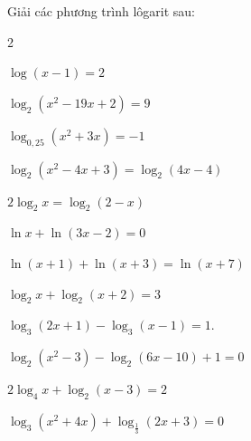 \begin{vd}
	Giải các phương trình lôgarit sau:
	\begin{enumEX}[a)]{2}
		\item $\log {\left( x-1 \right) }=2$
		\item $\log_2\left(x^2-19x+2\right)=9$
		\item $\log_{0{,25}}(x^2+3x)=-1 $
		\item $\log_2 {\left(x^2-4x+3 \right)}=\log_2 {\left(4x-4 \right)}$
		\item $2\log_2x=\log_2(2-x)$ 
		\item $ \ln x+ \ln (3x-2)=0$
		\item $\ln(x+1)+\ln(x+3)=\ln(x+7)$ 
		\item $\log_2x+\log_2(x+2)=3$
		\item  $\log_3(2x+1)-\log_3(x-1)=1$.
		\item $\log_2\left(x^2 - 3\right) - \log_2(6x - 10) + 1 = 0$
		\item $2\log_{4}{x}+\log_{2}\left(x-3\right)=2$
		\item $\log_3 (x^2 + 4x) + \log_{\tfrac{1}{3}} (2x+3) = 0$ 
		

\end{enumEX}
\end{vd}
